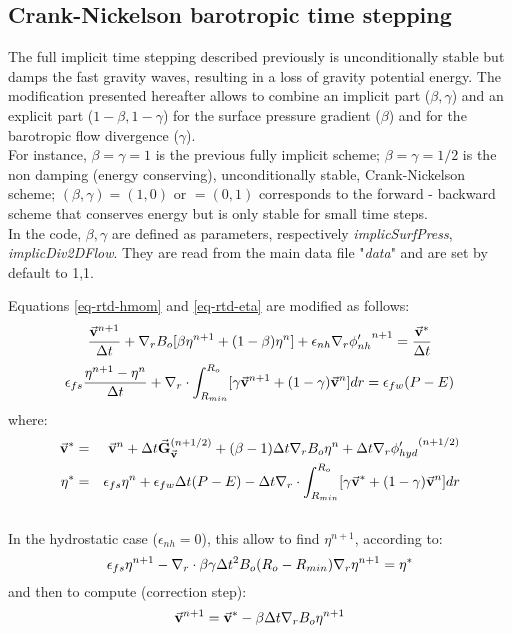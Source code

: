 \newpage
\subsection{Crank-Nickelson barotropic time stepping}

The full implicit time stepping described previously is unconditionally stable
but damps the fast gravity waves, resulting in a loss of 
gravity potential energy.
The modification presented hereafter allows to combine an implicit part
($\beta,\gamma$) and an explicit part ($1-\beta,1-\gamma$) for the surface
pressure gradient ($\beta$) and for the barotropic flow divergence ($\gamma$).
\\
For instance, $\beta=\gamma=1$ is the previous fully implicit scheme;
$\beta=\gamma=1/2$ is the non damping (energy conserving), unconditionally
stable, Crank-Nickelson scheme; $(\beta,\gamma)=(1,0)$ or $=(0,1)$
corresponds to the forward - backward scheme that conserves energy but is
only stable for small time steps.\\
In the code, $\beta,\gamma$ are defined as parameters, respectively 
{\it implicSurfPress}, {\it implicDiv2DFlow}. They are read from
the main data file "{\it data}" and are set by default to 1,1.

Equations \ref{eq-rtd-hmom} and \ref{eq-rtd-eta} are modified as follows:
$$
\frac{ \vec{\bf v}^{n+1} }{ \Delta t }
+ {\bf \nabla}_r B_o [ \beta {\eta}^{n+1} + (1-\beta) {\eta}^{n} ] 
+ \epsilon_{nh} {\bf \nabla}_r {\phi'_{nh}}^{n+1}
 = \frac{ \vec{\bf v}^* }{ \Delta t }
$$
$$
\epsilon_{fs} \frac{ {\eta}^{n+1} - {\eta}^{n} }{ \Delta t}
+ {\bf \nabla}_r \cdot \int_{R_{min}}^{R_o} 
[ \gamma \vec{\bf v}^{n+1} + (1-\gamma) \vec{\bf v}^{n}] dr
= \epsilon_{fw} (P-E)
$$
where:
\begin{eqnarray*}
\vec{\bf v}^* & = &
\vec{\bf v} ^{n} + \Delta t \vec{\bf G}_{\vec{\bf v}} ^{(n+1/2)}
+ (\beta-1) \Delta t {\bf \nabla}_r B_o {\eta}^{n}
+ \Delta t {\bf \nabla}_r {\phi'_{hyd}}^{(n+1/2)}
\\
{\eta}^* & = &
\epsilon_{fs} {\eta}^{n} + \epsilon_{fw} \Delta t (P-E) 
- \Delta t {\bf \nabla}_r \cdot \int_{R_{min}}^{R_o} 
[ \gamma \vec{\bf v}^* + (1-\gamma) \vec{\bf v}^{n}] dr
\end{eqnarray*}
\\
In the hydrostatic case ($\epsilon_{nh}=0$),
this allow to find ${\eta}^{n+1}$, according to:
$$
\epsilon_{fs} {\eta}^{n+1} -
{\bf \nabla}_r \cdot \beta\gamma \Delta t^2 B_o (R_o - R_{min})
{\bf \nabla}_r {\eta}^{n+1}
= {\eta}^*
$$ 
and then to compute (correction step):
$$
\vec{\bf v}^{n+1} = \vec{\bf v}^{*}
- \beta \Delta t {\bf \nabla}_r B_o {\eta}^{n+1}
$$

